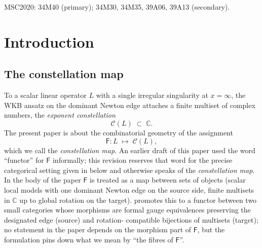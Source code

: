 \documentclass[aip,jmp,preprint,amsmath,amssymb,nofootinbib,floatfix]{revtex4-2}
\theoremstyle{plain}
\theoremstyle{definition}
\theoremstyle{remark}
\newcommand{\Cl}{\mathcal{C}}
\newcommand{\Fclass}{\mathsf{F}}
\begin{document}
\bigskip
\noindent\textsc{MSC2020:} 34M40 (primary); 34M30, 34M35, 39A06, 39A13
(secondary).




\section{Introduction}\label{sec:intro}

\subsection{The constellation map}\label{ssec:intro-functor}

To a scalar linear operator $L$ with a single irregular singularity at
$x = \infty$, the WKB ansatz on the dominant Newton edge attaches a
finite multiset of complex numbers, the \emph{exponent constellation}
\[
   \Cl(L) \;\subset\; \mathbb{C}.
\]
The present paper is about the combinatorial geometry of the
assignment
\[
   \Fclass \colon L \;\longmapsto\; \Cl(L),
\]
which we call the \emph{constellation map}. An earlier draft of this
paper used the word ``functor'' for $\Fclass$ informally; this revision
reserves that word for the precise categorical setting given in
 below and otherwise speaks of the
\emph{constellation map}. In the body of the paper $\Fclass$ is treated
as a map between sets of objects (scalar local models with one dominant
Newton edge on the source side, finite multisets in $\mathbb{C}$ up to
global rotation on the target).  promotes this to
a functor between two small categories whose morphisms are formal gauge
equivalences preserving the designated edge (source) and rotation-
compatible bijections of multisets (target); no statement in the paper
depends on the morphism part of $\Fclass$, but the formulation pins
down what we mean by ``the fibres of $\Fclass$''.
\end{document}
